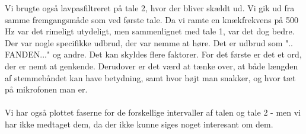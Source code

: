 Vi brugte også lavpasfiltreret på tale 2, hvor der bliver skældt ud. Vi gik ud fra samme fremgangsmåde som ved første tale. Da vi ramte en knækfrekvens på 500 Hz var det rimeligt utydeligt, men sammenlignet med tale 1, var det dog bedre. Der var nogle specifikke udbrud, der var nemme at høre. Det er udbrud som ".. FANDEN..." og andre. Det kan skyldes flere faktorer. For det første er det et ord, der er nemt at genkende. Derudover er det værd at tænke over, at både længden af stemmebåndet kan have betydning, samt hvor højt man snakker, og hvor tæt på mikrofonen man er. 
\\ 
\\

Vi har også plottet faserne for de forskellige intervaller af talen og tale 2 - men vi har ikke medtaget dem, da der ikke kunne siges noget interesant om dem.  













